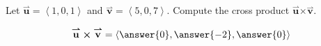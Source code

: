 \documentclass{ximera}
\author{Gregory Hartman \and Matthew Carr}
\begin{document}
\begin{exercise}
Let $\overset{\boldsymbol{\rightharpoonup}}{\mathbf{u}} = \left< 1,0,1 \right>$ and $\overset{\boldsymbol{\rightharpoonup}}{\mathbf{v}} = \left< 5,0,7 \right>$. Compute the cross product $\overset{\boldsymbol{\rightharpoonup}}{\mathbf{u}} \boldsymbol\times \overset{\boldsymbol{\rightharpoonup}}{\mathbf{v}}$.

\begin{prompt}
\[
\overset{\boldsymbol{\rightharpoonup}}{\mathbf{u}} \boldsymbol\times \overset{\boldsymbol{\rightharpoonup}}{\mathbf{v}} = \left< \answer{0},\answer{-2},\answer{0} \right>
\]
\end{prompt}


\end{exercise}
\end{document}
